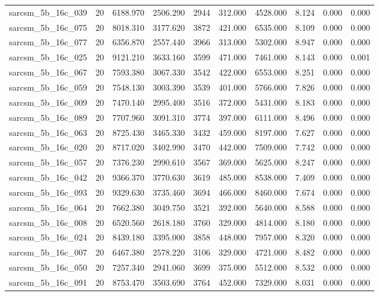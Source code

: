 \begin{tabular}{lrrrrrrrrr}
sarcsm\_5b\_16c\_039 & 20 & 6188.970 & 2506.290 & 2944 & 312.000 & 4528.000 & 8.124 & 0.000 & 0.000 \\
sarcsm\_5b\_16c\_075 & 20 & 8018.310 & 3177.620 & 3872 & 421.000 & 6535.000 & 8.109 & 0.000 & 0.000 \\
sarcsm\_5b\_16c\_077 & 20 & 6356.870 & 2557.440 & 3966 & 313.000 & 5302.000 & 8.947 & 0.000 & 0.000 \\
sarcsm\_5b\_16c\_025 & 20 & 9121.210 & 3633.160 & 3599 & 471.000 & 7461.000 & 8.143 & 0.000 & 0.001 \\
sarcsm\_5b\_16c\_067 & 20 & 7593.380 & 3067.330 & 3542 & 422.000 & 6553.000 & 8.251 & 0.000 & 0.000 \\
sarcsm\_5b\_16c\_059 & 20 & 7548.130 & 3003.390 & 3539 & 401.000 & 5766.000 & 7.826 & 0.000 & 0.000 \\
sarcsm\_5b\_16c\_009 & 20 & 7470.140 & 2995.400 & 3516 & 372.000 & 5431.000 & 8.183 & 0.000 & 0.000 \\
sarcsm\_5b\_16c\_089 & 20 & 7707.960 & 3091.310 & 3774 & 397.000 & 6111.000 & 8.496 & 0.000 & 0.000 \\
sarcsm\_5b\_16c\_063 & 20 & 8725.430 & 3465.330 & 3432 & 459.000 & 8197.000 & 7.627 & 0.000 & 0.000 \\
sarcsm\_5b\_16c\_020 & 20 & 8717.020 & 3402.990 & 3470 & 442.000 & 7509.000 & 7.742 & 0.000 & 0.000 \\
sarcsm\_5b\_16c\_057 & 20 & 7376.230 & 2990.610 & 3567 & 369.000 & 5625.000 & 8.247 & 0.000 & 0.000 \\
sarcsm\_5b\_16c\_042 & 20 & 9366.370 & 3770.630 & 3619 & 485.000 & 8538.000 & 7.409 & 0.000 & 0.000 \\
sarcsm\_5b\_16c\_093 & 20 & 9329.630 & 3735.460 & 3694 & 466.000 & 8460.000 & 7.674 & 0.000 & 0.000 \\
sarcsm\_5b\_16c\_064 & 20 & 7662.380 & 3049.750 & 3521 & 392.000 & 5640.000 & 8.588 & 0.000 & 0.000 \\
sarcsm\_5b\_16c\_008 & 20 & 6520.560 & 2618.180 & 3760 & 329.000 & 4814.000 & 8.180 & 0.000 & 0.000 \\
sarcsm\_5b\_16c\_024 & 20 & 8439.180 & 3395.000 & 3858 & 448.000 & 7957.000 & 8.320 & 0.000 & 0.000 \\
sarcsm\_5b\_16c\_007 & 20 & 6467.380 & 2578.220 & 3106 & 329.000 & 4721.000 & 8.482 & 0.000 & 0.000 \\
sarcsm\_5b\_16c\_050 & 20 & 7257.340 & 2941.060 & 3699 & 375.000 & 5512.000 & 8.532 & 0.000 & 0.000 \\
sarcsm\_5b\_16c\_091 & 20 & 8753.470 & 3503.690 & 3764 & 452.000 & 7329.000 & 8.031 & 0.000 & 0.000 \\

\end{tabular}
